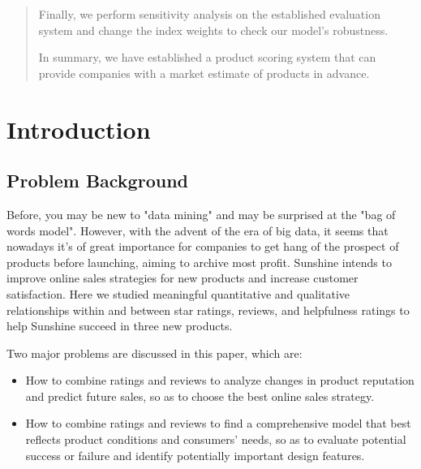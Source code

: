 \documentclass[12pt]{article}  %
\begin{document}
\begin{abstract}
Finally, we perform sensitivity analysis on the established evaluation system and change the index weights to check our model's robustness.


In summary, we have established a product scoring system that can provide companies with a market estimate of products in advance.


\end{abstract}

\maketitle  %
\tableofcontents  %


\section{Introduction}
\subsection{Problem Background}
Before, you may be new to "data mining" and may be surprised at the "bag of words model". However, with the advent of the era of big data, it seems that nowadays it's of great importance for companies to get hang of the prospect of products before launching, aiming to archive most profit. Sunshine intends to improve online sales strategies for new products and increase customer satisfaction. Here we studied meaningful quantitative and qualitative relationships within and between star ratings, reviews, and helpfulness ratings to help Sunshine succeed in three new products.

Two major problems are discussed in this paper, which are:
\begin{itemize}
    \item How to combine ratings and reviews to analyze changes in product reputation and predict future sales, so as to choose the best online sales strategy.
    \item How to combine ratings and reviews to find a comprehensive model that best reflects product conditions and consumers' needs, so as to evaluate potential success or failure and identify potentially important design features.
\end{itemize}
\end{document}

